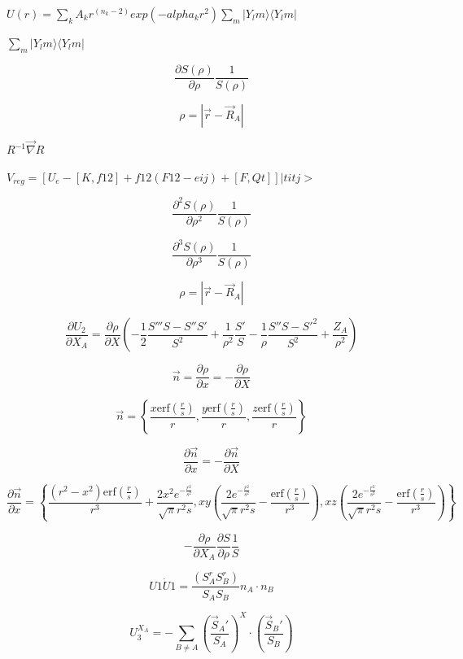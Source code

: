 \documentclass{article}
\begin{document}
$  U(r) = \sum_k A_k r^(n_k-2) exp(-alpha_k r^2) \sum_m |Y_lm \rangle \langle Y_lm| $
\pagebreak

$\sum_m |Y_lm \rangle \langle Y_lm|$
\pagebreak

\[
    \frac{\partial S(\rho)}{\partial \rho} \frac{1}{S(\rho)}
\]
\pagebreak

\[
   \rho = |\vec r - \vec R_A |
\]
\pagebreak

$R^{-1} \vec\nabla R$
\pagebreak

$ V_{reg} = [ U_e - [K,f12] + f12(F12-eij) + [F,Qt] ]|titj> $
\pagebreak

\[
    \frac{\partial^2 S(\rho)}{\partial \rho^2} \frac{1}{S(\rho)}
\]
\pagebreak

\[
    \frac{\partial^3 S(\rho)}{\partial \rho^3} \frac{1}{S(\rho)}
\]
\pagebreak

\[
  \rho = \left| \vec r- \vec R_A \right|
\]
\pagebreak

\[
\frac{\partial U_2}{\partial X_A} = \frac{\partial \rho}{\partial X}
          \left(-\frac{1}{2}\frac{S''' S - S'' S'}{S^2} + \frac{1}{\rho^2}\frac{S'}{S}
          - \frac{1}{\rho} \frac{S''S - S'^2}{S^2} + \frac{Z_A}{\rho^2}\right)
\]
\pagebreak

\[
    \vec n  = \frac{\partial \rho}{\partial x} = -\frac{\partial \rho}{\partial X}
\]
\pagebreak

\[
\vec n = \left\{\frac{x \mathrm{erf}\left(\frac{r}{s}\right)}{r},
         \frac{y \mathrm{erf}\left(\frac{r}{s}\right)}{r},
         \frac{z \mathrm{erf}\left(\frac{r}{s}\right)}{r}\right\}
\]
\pagebreak

\[
    \frac{\partial \vec n}{\partial x}  = -\frac{\partial \vec n}{\partial X}
\]
\pagebreak

\[
\frac{\partial\vec n}{\partial x} =
\left\{\frac{\left(r^2-x^2\right) \mathrm{erf}\left(\frac{r}{s}\right)}{r^3}
   +\frac{2 x^2 e^{-\frac{r^2}{s^2}}}{\sqrt{\pi } r^2 s},
 x y \left(\frac{2 e^{-\frac{r^2}{s^2}}}{\sqrt{\pi } r^2 s}
   -\frac{\mathrm{erf}\left(\frac{r}{s}\right)}{r^3}\right),
 x z \left(\frac{2 e^{-\frac{r^2}{s^2}}}{\sqrt{\pi } r^2 s}
   -\frac{\mathrm{erf}\left(\frac{r}{s}\right)}{r^3}\right)\right\}
\]
\pagebreak

\[
 -\frac{\partial \rho}{\partial X_A}\frac{\partial S}{\partial \rho}\frac{1}{S}
\]
\pagebreak

\[
 U1\dot U1 = \frac{\left(S^r_A S^r_B\right)}{S_A S_B} n_A \cdot n_B
\]
\pagebreak

\[
U_3^{X_A} = -\sum_{B\neq A}\left(\frac{\vec S_A'}{S_A}\right)^X\cdot\left(\frac{\vec S_B'}{S_B}\right)
\]
\pagebreak
\end{document}
